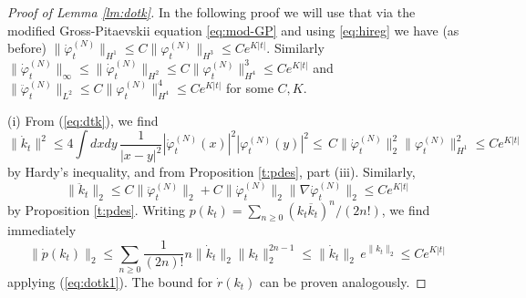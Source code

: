 \documentclass[11pt,a4paper]{article}
\newcommand{\ekt}{e^{K\lvert t\rvert}}	%
\newcommand{\di}{{d}}		%
\newcommand{\norm}[1]{\lVert#1\rVert}	%
\newcommand{\ph}{\varphi_t^{(N)}}	%
\newcommand{\phdot}{\dot{\varphi}_t^{(N)}}	%
\newcommand{\phddot}{\ddot{\varphi}_t^{(N)}}	%
\begin{document}
\begin{proof}[Proof of Lemma \ref{lm:dotk}]
In the following proof we will use that via the modified Gross-Pitaevskii equation \eqref{eq:mod-GP} and using \eqref{eq:hireg} we have (as before) $\norm{\phdot}_{H^1} \leq C \norm{\ph}_{H^3} \leq C \ekt$. Similarly $\norm{\phdot}_\infty \leq \norm{\phdot}_{H^2} \leq C \norm{\ph}_{H^4}^3 \leq C \ekt$ and $\norm{\phddot}_{L^2} \leq C \norm{\ph}_{H^4}^4 \leq C \ekt$ for some $C,K$.

(i) {F}rom (\ref{eq:dtk}), we find
\begin{equation}\label{eq:dotk1}\norm{\dot k_t}^2 \leq 4 \int \di x\di y\, \frac{1}{|x-y|^2}  |\phdot(x)|^2 |\ph(y)|^2 \leq \, C\| \phdot \|_2^2 \| \ph \|_{H^1}^2 \leq C e^{K |t|} \end{equation}
by Hardy's inequality, and from Proposition \ref{t:pdes}, part (iii). Similarly, 
\[ \| \ddot k_t \|_2 \leq C \| \ddot \varphi_t^{(N)} \|_2 + C \| \dot \varphi_t^{(N)} \|_2 \| \nabla \dot \varphi_t^{(N)} \|_2 \leq C e^{K |t|} \]
by Proposition \ref{t:pdes}. Writing $p (k_t) = \sum_{n \geq 0} (k_t \overline{k}_t)^n / (2n!)$, we find immediately
\[ \| \dot p (k_t) \|_2 \leq \sum_{n \geq 0} \frac{1}{(2n)!} n \| \dot k_t \|_2 \| k_t \|_2^{2n-1} \leq \| \dot k_t \|_2 \, e^{ \|k_t \|_2} \leq C e^{K |t|} \]
applying (\ref{eq:dotk1}). The bound for $\dot r (k_t)$ can be proven analogously. 


\end{proof}
\end{document}
